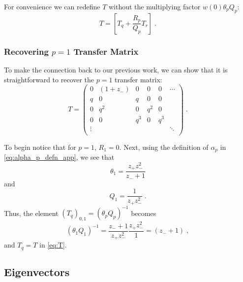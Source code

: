 \documentclass[a4paper,10pt]{article}
\begin{document}
For convenience we can redefine $T$ without the multiplying factor $w(0)\theta_p Q_p$:
\begin{equation}
  T = \left[ T_q + \frac{R_p}{Q_p} T_r \right] \;.
\end{equation}

\subsubsection{Recovering $p=1$ Transfer Matrix}

To make the connection back to our previous work, we can show that it is straightforward to recover the $p=1$ transfer matrix:
\begin{equation}\label{eq:T}
  T = \begin{pmatrix}
       0      & (1+z_-)& 0      & 0      & 0      & \cdots \\
       q      & 0      & q      & 0      & 0      &        \\
       0      & q^2    & 0      & q^2    & 0      &        \\
       0      & 0      & q^3    & 0      & q^3    &        \\
       \vdots &        &        &        &        & \ddots \\
      \end{pmatrix} \;.
\end{equation}

To begin notice that for $p=1$, $R_1 = 0$. Next, using the definition of $\alpha_p$ in \eqref{eq:alpha_p_defn_app}, we see that 
\begin{equation}
  \theta_1 = \frac{z_+ z_-^2}{z_-+1} 
\end{equation}
and
\begin{equation}
 Q_1 = \frac{1}{z_+z_-^2} \;.
\end{equation}
Thus, the element $(T_q)_{0,1} = (\theta_p Q_p)^{-1}$ becomes
\begin{equation}
 (\theta_1 Q_1)^{-1}= \frac{z_-+1}{z_+ z_-^2} \frac{z_+z_-^2}{1} = (z_- + 1) \;, 
\end{equation}
and $T_q = T$ in \eqref{eq:T}. 


\subsection{Eigenvectors}
\end{document}
